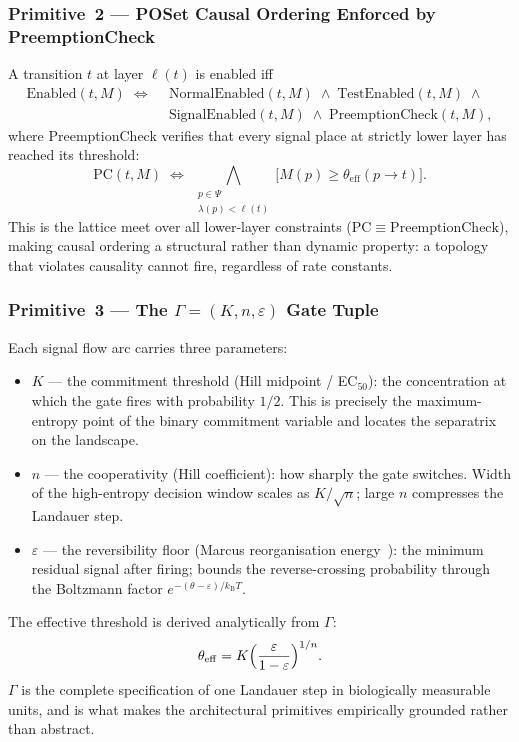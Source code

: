 \documentclass[11pt,a4paper]{article}
\newcommand{\kB}{k_{\mathrm{B}}}
\newcommand{\thetaeff}{\theta_{\mathrm{eff}}}
\begin{document}
\subsubsection{Primitive~2 --- POSet Causal Ordering Enforced by PreemptionCheck}
A transition \(t\) at layer \(\ell(t)\) is enabled iff
\begin{align}
  \mathrm{Enabled}(t,M) \;\iff\;\,
  &\mathrm{NormalEnabled}(t,M) \;\wedge\;
  \mathrm{TestEnabled}(t,M) \;\wedge\; \nonumber\\
  &\mathrm{SignalEnabled}(t,M) \;\wedge\;
  \mathrm{PreemptionCheck}(t,M),
  \label{eq:enabled}
\end{align}
where PreemptionCheck verifies that every signal place at strictly lower
layer has reached its threshold:
\begin{equation}
  \mathrm{PC}(t,M) \;\iff\;
  \bigwedge_{\substack{p \in \Psi \\ \lambda(p) < \ell(t)}}
  \bigl[ M(p) \geq \thetaeff(p \to t) \bigr].
  \label{eq:preemption}
\end{equation}
This is the lattice meet over all lower-layer constraints
(\(\mathrm{PC} \equiv \mathrm{PreemptionCheck}\)), making
causal ordering a structural rather than dynamic property: a topology
that violates causality cannot fire, regardless of rate constants.

\subsubsection{Primitive~3 --- The \(\Gamma = (K, n, \varepsilon)\) Gate Tuple}
Each signal flow arc carries three parameters:
\begin{itemize}
  \item \(K\) --- the commitment threshold (Hill midpoint / EC\(_{50}\)):
    the concentration at which the gate fires with probability \(1/2\).
    This is precisely the maximum-entropy point of the binary commitment
    variable and locates the separatrix on the landscape.
  \item \(n\) --- the cooperativity (Hill coefficient): how sharply the
    gate switches.  Width of the high-entropy decision window scales as
    \(K/\sqrt{n}\); large \(n\) compresses the Landauer step.
  \item \(\varepsilon\) --- the reversibility floor (Marcus reorganisation
    energy~\cite{Marcus1993}): the minimum residual signal after firing;
    bounds the reverse-crossing probability through the Boltzmann factor
    \(e^{-(\theta - \varepsilon)/\kB T}\).
\end{itemize}
The effective threshold is derived analytically from \(\Gamma\):
\begin{equation}
  \thetaeff = K\Bigl(\frac{\varepsilon}{1-\varepsilon}\Bigr)^{1/n}.
  \label{eq:theta-eff}
\end{equation}
\(\Gamma\) is the complete specification of one Landauer step in
biologically measurable units, and is what makes the architectural
primitives empirically grounded rather than abstract.
\end{document}
